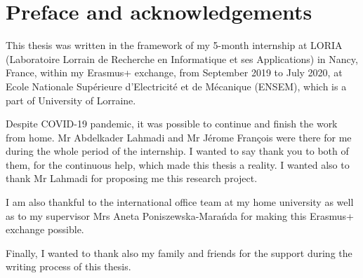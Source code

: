 % 

\cleardoublepage

\section*{Preface and acknowledgements}

This thesis was written in the framework of my 5-month internship at LORIA (Laboratoire Lorrain de Recherche en Informatique et ses Applications) in Nancy, France, within my Erasmus+ exchange, from September 2019 to July 2020, at Ecole Nationale Supérieure d'Electricité et de Mécanique (ENSEM), which is a part of University of Lorraine.

Despite COVID-19 pandemic, it was possible to continue and finish the work from home. Mr Abdelkader Lahmadi and Mr Jérome François were there for me during the whole period of the internship. I wanted to say thank you to both of them, for the continuous help, which made this thesis a reality. I wanted also to thank Mr Lahmadi for proposing me this research project.

I am also thankful to the international office team at my home university as well as to my supervisor Mrs Aneta Poniszewska-Marańda for making this Erasmus+ exchange possible.

Finally, I wanted to thank also my family and friends for the support during the writing process of this thesis.
